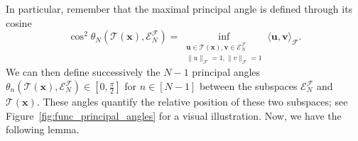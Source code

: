 \documentclass[twoside,11pt]{book}
\numberwithin{theorem}{chapter}
\numberwithin{definition}{chapter}
\numberwithin{proposition}{chapter}
\numberwithin{corollary}{chapter}
\numberwithin{example}{chapter}
\numberwithin{lemma}{chapter}
\numberwithin{assumption}{chapter}
\newcommand{\ab}[1]{\textcolor{red}{#1}}
\begin{document}
In particular, remember that the maximal principal angle is defined through its cosine
\begin{equation}
	\cos^{2} \theta_{N}(\mathcal{T}(\bm{x}),\mathcal{E}^{\mathcal{F}}_{N}) = \inf\limits_{\substack{\bm{u} \in \mathcal{T}(\bm{x}), \bm{v} \in \mathcal{E}^{\mathcal{F}}_{N}\\ \|u\|_{\mathcal{F}} = 1, \|v\|_{\mathcal{F}} = 1}} \langle \bm{u}, \bm{v} \rangle_{\mathcal{F}}.
\end{equation}
We can then define successively the $N-1$ principal angles $\theta_{n}(\mathcal{T}(\bm{x}),\mathcal{E}^{\mathcal{F}}_{N}) \in \left[0, \frac{\pi}{2}\right]$ for $ n\in [N-1]$ between the subspaces $\mathcal{E}^{\mathcal{F}}_{N}$ and $\mathcal{T}(\bm{x})$. These angles quantify the relative position of these two subspaces; see Figure~\ref{fig:func_principal_angles} for a visual illustration. Now, we have the following lemma.






\end{document}
